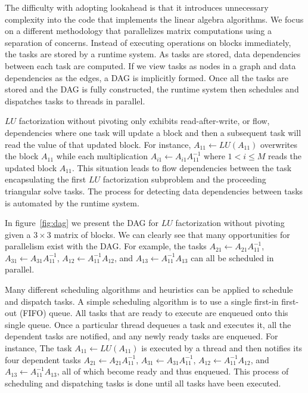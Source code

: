 The difficulty with adopting lookahead is that it introduces
unnecessary complexity into the code that implements the linear
algebra algorithms.
We focus on a different methodology that parallelizes matrix computations
using a separation of concerns.
Instead of executing operations on blocks immediately, the tasks are
stored by a runtime system.
As tasks are stored, data dependencies between each task are computed.
If we view tasks as nodes in a graph and data dependencies as the
edges, a \acf{DAG} is implicitly formed.
Once all the tasks are stored and the \ac{DAG} is fully constructed, the
runtime system then schedules and dispatches tasks to threads in
parallel.

$LU$ factorization without pivoting only exhibits read-after-write, or
flow, dependencies where one task will update a block and then a
subsequent task will read the value of that updated block.
For instance,
$A_{11} \leftarrow LU( A_{11} )$ overwrites the block $A_{11}$
while each multiplication 
$A_{i1} \leftarrow A_{i1} A_{11}^{-1}$ where $1 < i \leq M$
reads the updated block $A_{11}$. %
This situation leads to flow dependencies between the task
encapsulating the first $LU$ factorization subproblem and the
proceeding triangular solve tasks.
The process for detecting data dependencies between tasks is automated
by the runtime system.

In figure~\ref{fig:dag} we present the \ac{DAG} for $LU$ factorization
without pivoting given a 
$3 \times 3$ matrix of blocks.
We can clearly see that many opportunities for parallelism exist with
the \ac{DAG}.
For example, the tasks 
$A_{21} \leftarrow A_{21} A_{11}^{-1}$,
$A_{31} \leftarrow A_{31} A_{11}^{-1}$,
$A_{12} \leftarrow A_{11}^{-1} A_{12}$, and
$A_{13} \leftarrow A_{11}^{-1} A_{13}$
can all be scheduled in parallel.

Many different scheduling algorithms and heuristics can be applied to
schedule and dispatch tasks.
A simple scheduling algorithm is to use a single first-in first-out
(FIFO) queue.
All tasks that are ready to execute are enqueued onto this single
queue.
Once a particular thread dequeues a task and executes it, all the
dependent tasks are notified, and any newly ready tasks are enqueued.
For instance,
The task $A_{11} \leftarrow LU( A_{11} )$ is executed by a thread and
then notifies its four dependent tasks
$A_{21} \leftarrow A_{21} A_{11}^{-1}$,
$A_{31} \leftarrow A_{31} A_{11}^{-1}$,
$A_{12} \leftarrow A_{11}^{-1} A_{12}$, and
$A_{13} \leftarrow A_{11}^{-1} A_{13}$,
all of which become ready and thus enqueued.
This process of scheduling and dispatching tasks is done until all
tasks have been executed.

